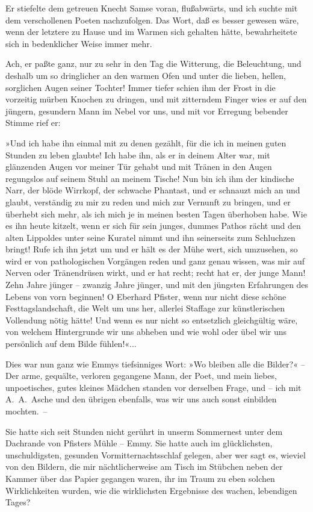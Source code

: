 Er stiefelte dem getreuen Knecht Samse voran, flußabwärts, und ich
suchte mit dem verschollenen Poeten nachzufolgen. Das Wort, daß es
besser gewesen wäre, wenn der letztere zu Hause und im Warmen sich
gehalten hätte, bewahrheitete sich in bedenklicher Weise immer
mehr.

Ach, er paßte ganz, nur zu sehr in den Tag die Witterung, die
Beleuchtung, und deshalb um so dringlicher an den warmen Ofen und
unter die lieben, hellen, sorglichen Augen seiner Tochter! Immer
tiefer schien ihm der Frost in die vorzeitig mürben Knochen zu
dringen, und mit zitterndem Finger wies er auf den jüngern,
gesundern Mann im Nebel vor uns, und mit vor Erregung bebender
Stimme rief er:

»Und ich habe ihn einmal mit zu denen gezählt, für die ich in
meinen guten Stunden zu leben glaubte! Ich habe ihn, als er in
deinem Alter war, mit glänzenden Augen vor meiner Tür gehabt und
mit Tränen in den Augen regungslos auf seinem Stuhl an meinem
Tische! Nun bin ich ihm der kindische Narr, der blöde Wirrkopf, der
schwache Phantast, und er schnauzt mich an und glaubt, verständig
zu mir zu reden und mich zur Vernunft zu bringen, und er überhebt
sich mehr, als ich mich je in meinen besten Tagen überhoben habe.
Wie es ihn heute kitzelt, wenn er sich für sein junges, dummes
Pathos rächt und den alten Lippoldes unter seine Kuratel nimmt und
ihn seinerseits zum Schluchzen bringt! Rufe ich ihn jetzt um und er
hält es der Mühe wert, sich umzusehen, so wird er von
pathologischen Vorgängen reden und ganz genau wissen, was mir auf
Nerven oder Tränendrüsen wirkt, und er hat recht; recht hat er, der
junge Mann! Zehn Jahre jünger – zwanzig Jahre jünger, und mit den
jüngsten Erfahrungen des Lebens von vorn beginnen! O Eberhard
Pfister, wenn nur nicht diese schöne Festtagslandschaft, die Welt
um uns her, allerlei Staffage zur künstlerischen Vollendung nötig
hätte! Und wenn es nur nicht so entsetzlich gleichgültig wäre, von
welchem Hintergrunde wir uns abheben und wie wohl oder übel wir uns
persönlich auf dem Bilde fühlen!«...

Dies war nun ganz wie Emmys tiefsinniges Wort: »Wo bleiben alle die
Bilder?« – Der arme, gequälte, verloren gegangene Mann, der Poet,
und mein liebes, unpoetisches, gutes kleines Mädchen standen vor
derselben Frage, und – ich mit A.~A.~Asche und den übrigen
ebenfalls, was wir uns auch sonst einbilden mochten.~–

Sie hatte sich seit Stunden nicht gerührt in unserm Sommernest
unter dem Dachrande von Pfisters Mühle – Emmy. Sie hatte auch im
glücklichsten, unschuldigsten, gesunden Vormitternachtsschlaf
gelegen, aber wer sagt es, wieviel von den Bildern, die mir
nächtlicherweise am Tisch im Stübchen neben der Kammer über das
Papier gegangen waren, ihr im Traum zu eben solchen Wirklichkeiten
wurden, wie die wirklichsten Ergebnisse des wachen, lebendigen
Tages?

